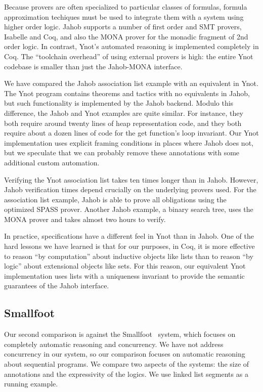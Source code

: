 \documentclass[preprint,nocopyrightspace]{sigplanconf}
\begin{document}
{Because provers are often specialized to particular
classes of formulas, formula approximation techiques must be used to integrate them with
a system using higher order logic. Jahob supports a number of first order and SMT provers,
Isabelle and Coq, and also the MONA prover for the monadic fragment of 2nd order logic.  
In contrast, Ynot's automated reasoning is implemented completely in Coq.  
The ``toolchain overhead'' of using external provers is high: the 
entire Ynot codebase is smaller than just the Jahob-MONA interface.

We have compared the Jahob association list example with an equivalent
in Ynot.  The Ynot program contains theorems and tactics with
no equivalents in Jahob, but such functionality 
is implemented by the Jahob backend.  Modulo this difference, 
the Jahob and Ynot examples are quite similar.  For instance, they 
both require around twenty lines of heap representation code,
and they both require about a dozen lines of code for the
get function's loop invariant.  Our Ynot implementation 
uses explicit framing conditions in
places where Jahob does not, but we speculate that we can probably
remove these annotations with some additional custom automation.

Verifying the Ynot association list takes ten times longer than in Jahob.
However, Jahob verification times depend crucially on the underlying
provers used.  For the association list example, Jahob is able to prove
all obligations using the optimized SPASS prover.  Another Jahob example,
a binary search tree, uses the MONA prover and takes almost two hours to verify.   

In practice, specifications have a different feel in Ynot than in Jahob.  One of
the hard lessons we have learned is that for our purposes, in Coq, 
it is more effective to reason ``by computation'' about inductive objects like lists
than to reason ``by logic'' about extensional objects like sets.  For this reason,
our equivalent Ynot implementation
uses lists with a uniqueness invariant to provide the semantic guarantees
of the Jahob interface.

\subsection{Smallfoot}

Our second comparison is against the Smallfoot~\cite{smallfoot}
system, which focuses on completely automatic reasoning and
concurrency.  We have not address concurrency in our system, so
our comparison focuses on automatic reasoning about sequential
programs.  We compare two aspects of the systems: the size of
annotations and the expressivity of the
logics. We use linked list segments as a running example.

}
\end{document}
